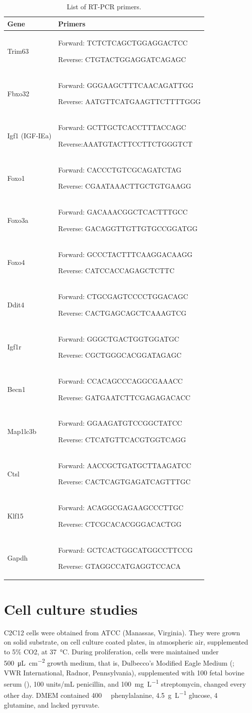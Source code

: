 \documentclass[12pt,english]{report}\usepackage[]{graphicx}\usepackage[]{color}
\providecommand{\tabularnewline}{\\}
\begin{document}
\begin{table}
\begin{tabular}{|>{\centering}p{1in}|>{\raggedright}p{4in}|}
\hline 
Gene &
Primers\tabularnewline
\hline 
\hline 
Trim63 &
Forward: TCTCTCAGCTGGAGGACTCC

Reverse: CTGTACTGGAGGATCAGAGC\tabularnewline
\hline 
Fbxo32 &
Forward: GGGAAGCTTTCAACAGATTGG

Reverse: AATGTTCATGAAGTTCTTTTGGG\tabularnewline
\hline 
Igf1 (IGF-IEa) &
Forward: GCTTGCTCACCTTTACCAGC

Reverse:AAATGTACTTCCTTCTGGGTCT\tabularnewline
\hline 
Foxo1 &
Forward: CACCCTGTCGCAGATCTAG

Reverse: CGAATAAACTTGCTGTGAAGG\tabularnewline
\hline 
Foxo3a &
Forward: GACAAACGGCTCACTTTGCC

Reverse: GACAGGTTGTTGTGCCGGATGG\tabularnewline
\hline 
Foxo4 &
Forward: GCCCTACTTTCAAGGACAAGG

Reverse: CATCCACCAGAGCTCTTC\tabularnewline
\hline 
Ddit4 &
Forward: CTGCGAGTCCCCTGGACAGC

Reverse: CACTGAGCAGCTCAAAGTCG\tabularnewline
\hline 
Igf1r &
Forward: GGGCTGACTGGTGGATGC

Reverse: CGCTGGGCACGGATAGAGC\tabularnewline
\hline 
Becn1 &
Forward: CCACAGCCCAGGCGAAACC

Reverse: GATGAATCTTCGAGAGACACC\tabularnewline
\hline 
Map1lc3b &
Forward: GGAAGATGTCCGGCTATCC

Reverse: CTCATGTTCACGTGGTCAGG\tabularnewline
\hline 
Ctsl &
Forward: AACCGCTGATGCTTAAGATCC

Reverse: CACTCAGTGAGATCAGTTTGC\tabularnewline
\hline 
Klf15 &
Forward: ACAGGCGAGAAGCCCTTGC

Reverse: CTCGCACACGGGACACTGG\tabularnewline
\hline 
Gapdh &
Forward: GCTCACTGGCATGGCCTTCCG

Reverse: GTAGGCCATGAGGTCCACA\tabularnewline
\hline 
\end{tabular}

\protect\caption{List of RT-PCR primers.\label{tab:List-of-RT-PCR}}


\end{table}



\section{Cell culture studies}

C2C12 cells were obtained from ATCC (Manassas, Virginia). They were
grown on solid substrate, on cell culture coated plates, in atmospheric
air, supplemented to 5\% CO2, at \SI{37}{\celsius}. During proliferation,
cells were maintained under \SI{500}{\micro\liter\per\centi\meter\squared}
growth medium, that is, Dulbecco's Modified Eagle Medium (;
VWR International, Radnor, Pennsylvania), supplemented with \SI{100}{\promille}
fetal bovine serum (), 100
units/mL penicillin, and \SI{100}{\milli\gram\per\liter} streptomycin,
changed every other day. DMEM contained \SI{400}{\micro\molar} phenylalanine,
\SI{4.5}{\gram\per\liter} glucose, \SI{4}{\milli\molar} glutamine,
and lacked pyruvate.
\end{document}
